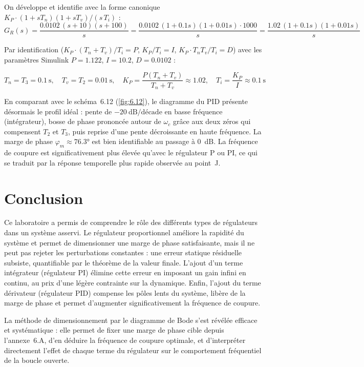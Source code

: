 \documentclass[a4paper,5pt]{article}
\begin{document}
On développe et identifie avec la forme canonique
$K_P \cdot (1 + sT_n)(1 + sT_v)/(s\,T_i)$ :
\begin{equation}
G_R(s) = \frac{0.0102\,(s+10)(s+100)}{s}
= \frac{0.0102\,(1+0.1s)(1+0.01s) \cdot 1000}{s}
= \frac{1.02\,(1+0.1s)(1+0.01s)}{s}
\end{equation}

Par identification ($K_P \cdot (T_n + T_v)/T_i = P$, $K_P/T_i = I$,
$K_P \cdot T_n T_v / T_i = D$) avec les paramètres Simulink
$P = 1.122$, $I = 10.2$, $D = 0.0102$ :

\begin{equation}
T_n = T_3 = 0.1\ \mathrm{s}, \quad T_v = T_2 = 0.01\ \mathrm{s},
\quad K_P = \frac{P(T_n+T_v)}{T_n+T_v} \approx 1.02,
\quad T_i = \frac{K_P}{I} \approx 0.1\ \mathrm{s}
\end{equation}

En comparant avec le schéma~6.12 (\ref{fig:6.12}), le diagramme du PID
présente désormais le profil idéal : pente de $-20\ \mathrm{dB/décade}$
en basse fréquence (intégrateur), bosse de phase prononcée autour de
$\omega_c$ grâce aux deux zéros qui compensent $T_2$ et $T_3$, puis
reprise d'une pente décroissante en haute fréquence. La marge de phase
$\varphi_m \approx 76.3°$ est bien identifiable au passage à 0~dB.
La fréquence de coupure est significativement plus élevée qu'avec le
régulateur P ou PI, ce qui se traduit par la réponse temporelle plus
rapide observée au point~J.
\pagebreak
\section{Conclusion}

Ce laboratoire a permis de comprendre le rôle des différents types de
régulateurs dans un système asservi. Le régulateur proportionnel améliore
la rapidité du système et permet de dimensionner une marge de phase
satisfaisante, mais il ne peut pas rejeter les perturbations constantes :
une erreur statique résiduelle subsiste, quantifiable par le théorème de
la valeur finale. L'ajout d'un terme intégrateur (régulateur PI) élimine
cette erreur en imposant un gain infini en continu, au prix d'une légère
contrainte sur la dynamique. Enfin, l'ajout du terme dérivateur (régulateur
PID) compense les pôles lents du système, libère de la marge de phase et
permet d'augmenter significativement la fréquence de coupure.

La méthode de dimensionnement par le diagramme de Bode s'est révélée
efficace et systématique : elle permet de fixer une marge de phase cible
depuis l'annexe~6.A, d'en déduire la fréquence de coupure optimale,
et d'interpréter directement l'effet de chaque terme du régulateur sur
le comportement fréquentiel de la boucle ouverte.
\end{document}
